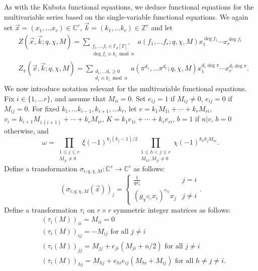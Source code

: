 \documentclass[11pt,letterpaper]{article}
\theoremstyle{definition}
\theoremstyle{remark}
\numberwithin{equation}{section}
\theoremstyle{dotless}
\newcommand{\C}{\mathbb{C}}
\newcommand{\Z}{\mathbb{Z}}
\newcommand{\F}{\mathbb{F}}
\begin{document}
As with the Kubota functional equations, we deduce functional equations for the multivariable series based on the single-variable functional equations. We again set $\vec{x}=(x_1, \ldots x_r) \in \C^r$, $\vec{k}=(k_1, \ldots k_r) \in \Z^r$ and let 
\begin{align}
&Z(\vec{x}, \vec{k}; q, \chi, M) = \sum_{\substack{f_1, \ldots f_r \in \F_q[T]^+ \\ \deg f_i \equiv k_i \bmod n}} a(f_1,\ldots f_r; q, \chi, M) x_1^{\deg f_1} \cdots x_r^{\deg f_r} \\
&Z_{\pi}(\vec{x}, \vec{k}; q, \chi, M) = \sum_{\substack{d_1, \ldots d_r \geq 0 \\ d_i \equiv k_i \bmod n}} a(\pi^{d_1}, \ldots \pi^{d_r}; q, \chi, M) x_1^{d_1\deg \pi} \cdots x_r^{d_r \deg \pi}.
\end{align}
We now introduce notation relevant for the multivariable functional equations. Fix $i \in \{1, \ldots r\}$, and assume that $M_{ii}=0$. Set $e_{ij}=1$ if $M_{ij} \neq 0$, $e_{ij}=0$ if $M_{ij} = 0$. For fixed $k_1, \ldots k_{i-1}, k_{i+1}, \ldots k_r$, let $v=k_1 M_{1i} + \cdots +k_{r} M_{ri}$, $v_i= k_{i+1} M_{i \, (i+1)}+ \cdots + k_r M_{ir}$, $K=k_1 e_{1i} + \cdots + k_{r} e_{ri}$, $b=1$ if $n|v$, $b=0$ otherwise, and 
\begin{equation*}
    \omega = \prod_{\substack{1 \leq j \leq r \\ M_{ji} \neq 0}} \xi(-1)^{k_j(k_j-1)/2} \prod_{\substack{1 \leq h<j \leq r \\ M_{hi}, M_{ji} \neq 0}} \chi(-1)^{k_h k_j M_{hi} }.
\end{equation*}
Define a transformation $\sigma_{i; q, \chi, M}:\C^r \to \C^r$ as follows:
\begin{equation} \label{sigma-i-dirichlet}
(\sigma_{i; q, \chi, M}(\vec{x}))_j=\left\lbrace \begin{array}{cc}
\frac{1}{qx_i} & j=i \\ (g_{\chi^{M_{ij}}}x_i)^{e_{ij}}x_j & j \neq i \end{array} \right. .
\end{equation}
Define a transformation $\tau_i$ on $r \times r$ symmetric integer matrices as follows: 
\begin{equation}
\begin{split}
&(\tau_i(M))_{ii}=M_{ii}=0 \\
&(\tau_i(M))_{ij}=-M_{ij} \text{ for all } j\neq i \\
&(\tau_i(M))_{jj} = M_{jj}+e_{ji}(M_{ji}+n/2) \text{ for all } j\neq i \\
&(\tau_i(M))_{hj} = M_{hj}+e_{hi}e_{ij}(M_{hi}+M_{ij}) \text{ for all } h\neq j \neq i .
\end{split}
\end{equation}
\end{document}
